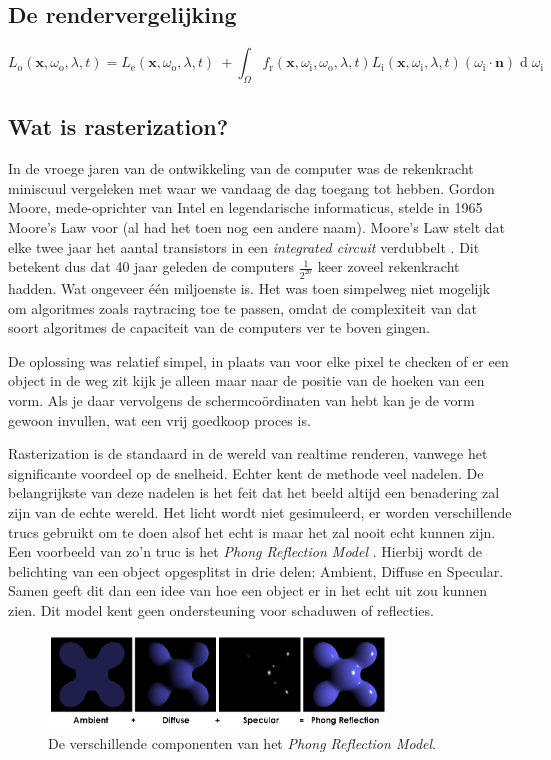 \documentclass[12pt, a4paper]{article}
\begin{document}
\subsection{De rendervergelijking}
\[
L_{\text{o}}(\mathbf x, \omega_{\text{o}}, \lambda, t) = L_{\text{e}}(\mathbf x, \omega_{\text{o}}, \lambda, t) \ + \int_\Omega f_{\text{r}}(\mathbf x, \omega_{\text{i}}, \omega_{\text{o}}, \lambda, t) L_{\text{i}}(\mathbf x, \omega_{\text{i}}, \lambda, t) (\omega_{\text{i}}\cdot\mathbf n) \operatorname d \omega_{\text{i}}
\]

\subsection{Wat is rasterization?}
In de vroege jaren van de ontwikkeling van de computer was de rekenkracht miniscuul vergeleken met waar we vandaag de dag toegang tot hebben. Gordon Moore, mede-oprichter van Intel en legendarische informaticus, stelde in 1965 Moore's Law voor (al had het toen nog een andere naam). Moore's Law stelt dat elke twee jaar het aantal transistors in een \emph{integrated circuit} verdubbelt \cite{CrammingComponents}. Dit betekent dus dat 40 jaar geleden de computers \(\frac{1}{2^{20}}\) keer zoveel rekenkracht hadden. Wat ongeveer één miljoenste is. Het was toen simpelweg niet mogelijk om algoritmes zoals raytracing toe te passen, omdat de complexiteit van dat soort algoritmes de capaciteit van de computers ver te boven gingen.

De oplossing was relatief simpel, in plaats van voor elke pixel te checken of er een object in de weg zit kijk je alleen maar naar de positie van de hoeken van een vorm. Als je daar vervolgens de schermcoördinaten van hebt kan je de vorm gewoon invullen, wat een vrij goedkoop proces is.

Rasterization is de standaard in de wereld van realtime renderen, vanwege het significante voordeel op de snelheid. Echter kent de methode veel nadelen. De belangrijkste van deze nadelen is het feit dat het beeld altijd een benadering zal zijn van de echte wereld. Het licht wordt niet gesimuleerd, er worden verschillende trucs gebruikt om te doen alsof het echt is maar het zal nooit echt kunnen zijn. Een voorbeeld van zo'n truc is het \emph{Phong Reflection Model} \cite{PhongReflectionModel}. Hierbij wordt de belichting van een object opgesplitst in drie delen: Ambient, Diffuse en Specular. Samen geeft dit dan een idee van hoe een object er in het echt uit zou kunnen zien. Dit model kent geen ondersteuning voor schaduwen of reflecties.
\begin{figure}[h]
\centering
\includegraphics[width=0.8\textwidth]{Phong_components.png}
\caption{De verschillende componenten van het \emph{Phong Reflection Model}.}
\label{fig:phong_components}
\end{figure}
\end{document}
